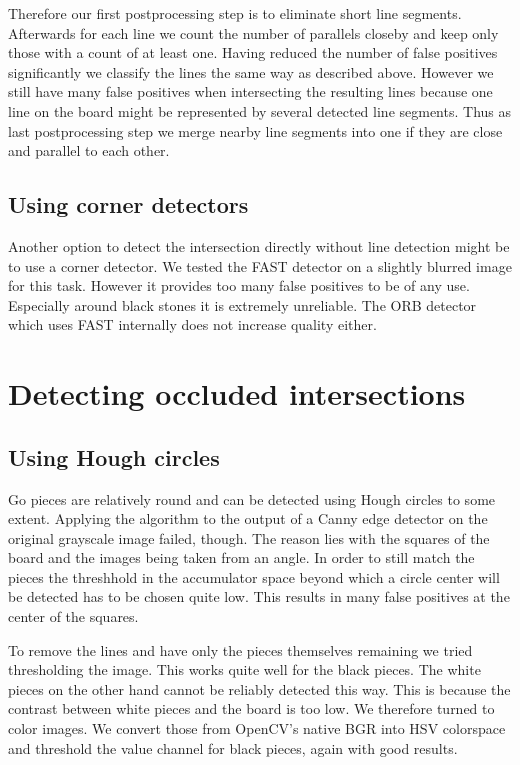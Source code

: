 	Therefore our first postprocessing step is to eliminate short line segments. Afterwards for each line we count the number of parallels closeby and keep only those with a count of at least one. Having reduced the number of false positives significantly we classify the lines the same way as described above. However we still have many false positives when intersecting the resulting lines because one line on the board might be represented by several detected line segments. Thus as last postprocessing step we merge nearby line segments into one if they are close and parallel to each other.

	\subsection{Using corner detectors}
	\label{detector-visible-corners}
	Another option to detect the intersection directly without line detection might be to use a corner detector. We tested the FAST \cite{} detector on a slightly blurred image for this task. However it provides too many false positives to be of any use. Especially around black stones it is extremely unreliable. The ORB detector which uses FAST internally does not increase quality either.

	\section{Detecting occluded intersections}
	\subsection{Using Hough circles}
	\label{detector-occluded-hough}
	Go pieces are relatively round and can be detected using Hough circles to some extent. Applying the algorithm to the output of a Canny edge detector on the original grayscale image failed, though. The reason lies with the squares of the board and the images being taken from an angle. In order to still match the pieces the threshhold in the accumulator space beyond which a circle center will be detected has to be chosen quite low. This results in many false positives at the center of the squares.

	To remove the lines and have only the pieces themselves remaining we tried thresholding the image. This works quite well for the black pieces. The white pieces on the other hand cannot be reliably detected this way. This is because the contrast between white pieces and the board is too low. We therefore turned to color images. We convert those from OpenCV's native BGR into HSV colorspace and threshold the value channel for black pieces, again with good results.

